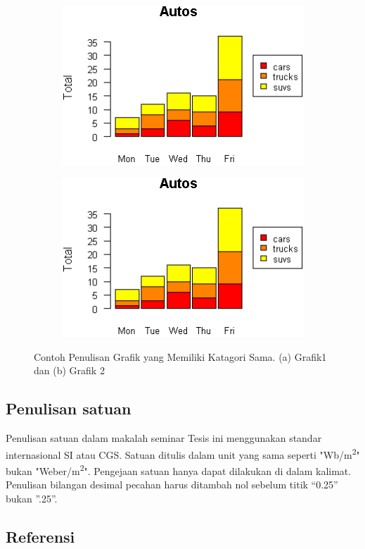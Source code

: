 \documentclass[12pt,reqno]{semhas-tesis-filkom}
\begin{document}
\begin{figure}[ht]
  \centering
  \begin{subfigure}[h]{\columnwidth}
    \centering
  \includegraphics[width=0.6\columnwidth]{babs/images/bar_script4.png}
  \vspace*{1em}
  \end{subfigure}
  \begin{subfigure}[h]{\columnwidth}
    \centering
    \includegraphics[width=0.6\columnwidth]{babs/images/bar_script4.png}
  \end{subfigure}
  \caption{Contoh Penulisan Grafik yang Memiliki
  Katagori Sama. (a) Grafik1 dan (b) Grafik 2}
\end{figure}

\subsection{Penulisan satuan}

Penulisan satuan dalam makalah seminar Tesis ini
menggunakan standar internasional SI atau CGS. Satuan
ditulis dalam unit yang sama seperti "Wb/m\textsuperscript{2}" bukan
"Weber/m\textsuperscript{2}". Pengejaan satuan hanya dapat dilakukan di dalam kalimat. Penulisan bilangan desimal pecahan harus ditambah nol sebelum titik “0.25” bukan ”.25”. \cite{conv,notpub,report,thesis,unpub,website}

\subsection{Referensi}
\end{document}
